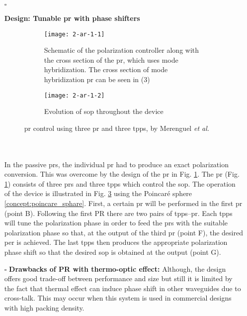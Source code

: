 \documentclass[../report.tex]{subfiles}
\begin{document}
	\begin{itemize}[leftmargin=*]
		
		\item[$\square$]\begin{minipage}[t]{\textwidth}\textbf{Design: Tunable \gls{pr} with phase shifters}
		\begin{figure}[H] %
			\begin{subfigure}[t]{0.45\textwidth}
				\texttt{[image: 2-ar-1-1]}
				\caption{Schematic of the polarization controller along with the cross section of the \gls{pr}, which uses mode hybridization. The cross section of mode hybridization \gls{pr} can be seen in (3)}
				\label{fig:2_ar_1_1}
			\end{subfigure}
			\hfill
			\begin{subfigure}[t]{0.45\textwidth}
				\texttt{[image: 2-ar-1-2]}
				\caption{Evolution of \gls{sop} throughout the device}
				\label{fig:2_ar_1_2}
			\end{subfigure}
			\caption{\gls{pr} control using three \gls{pr} and three \gls{tpps}, by Merenguel \textit{et al.} \cite{sarmiento-merenguel_demonstration_2015}}
		\end{figure}
		\end{minipage}\\\\
		\noindent In the passive \gls{pr}s, the individual \gls{pr} had to produce an exact polarization conversion. This was overcome by the design of the \gls{pr} in Fig. \ref{fig:2_ar_1_1}. The \gls{pr} (Fig. \ref{fig:2_ar_1_1}) consists of three \gls{pr}s and three \gls{tpps} which control the \gls{sop}. The operation of the device is illustrated in Fig. \ref{fig:2_ar_1_2} using the Poincaré sphere \ref{concept:poincare_sphare}. First, a certain \gls{pr} will be performed in the first \gls{pr} (point B). Following the first PR there are two pairs of \gls{tpps}–\gls{pr}. Each \gls{tpps} will tune the polarization phase in order to feed the \gls{pr}s with the suitable polarization phase so that, at the output of the third \gls{pr} (point F), the desired \gls{per} is achieved. The last \gls{tpps} then produces the appropriate polarization phase shift so that the desired \gls{sop} is obtained at the output (point G).
		
		\item[$\square$] \textbf{Drawbacks of PR with thermo-optic effect:}
		Although, the design offers good trade-off between performance and size but still it is limited by the fact that thermal effect can induce phase shift in other waveguides due to cross-talk. This may occur when this system is used in commercial designs with high packing density.
		

\end{itemize}
\end{document}
